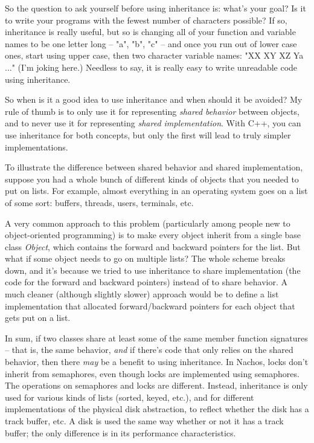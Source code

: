 So the question to ask yourself before using inheritance is:
what's your goal?  Is it to write your programs with the
fewest number of characters possible?  If so, inheritance is
really useful, but so is changing all of your function and variable 
names to be one letter long -- "a", "b", "c" -- and once you
run out of lower case ones, start using upper case, then two character 
variable names: "XX XY XZ Ya ..." (I'm joking here.)
Needless to say, it is really easy to write unreadable code
using inheritance.  

So when is it a good idea to use inheritance and when should it be
avoided?  My rule of thumb is to only use it for representing 
{\em shared behavior} between objects, and to never use it for
representing {\em shared implementation}.  With C++, you can use 
inheritance for both concepts, but only the first will lead to
truly simpler implementations.

To illustrate the difference between shared behavior and shared
implementation, suppose you had a whole bunch of different kinds
of objects that you needed to put on lists.  For example, almost everything
in an operating system goes on a list of some sort: buffers, threads,
users, terminals, etc.

A very common approach to this problem (particularly among people new
to object-oriented programming) is to make every object inherit from
a single base class {\em Object}, which contains the forward and backward
pointers for the list.  But what if some object needs to go on multiple
lists?  The whole scheme breaks down, and it's because we tried to use
inheritance to share implementation (the code for the forward and backward
pointers) instead of to share behavior.  A much cleaner (although slightly
slower) approach would
be to define a list implementation that allocated forward/backward
pointers for each object that gets put on a list.

In sum, if two classes share at least some of the same member function
signatures -- that is, the same behavior, {\em and} if there's code that
only relies on the shared behavior, then there {\em may}
be a benefit to using inheritance.  In Nachos, locks don't inherit from
semaphores, even though locks are implemented using semaphores.  The
operations on semaphores and locks are different.  Instead, inheritance is
only used for various kinds of lists (sorted, keyed, etc.),
and for different implementations of the physical disk abstraction,
to reflect whether the disk has a track buffer, etc.  A disk is used
the same way whether or not it has a track buffer; the only difference is
in its performance characteristics.

